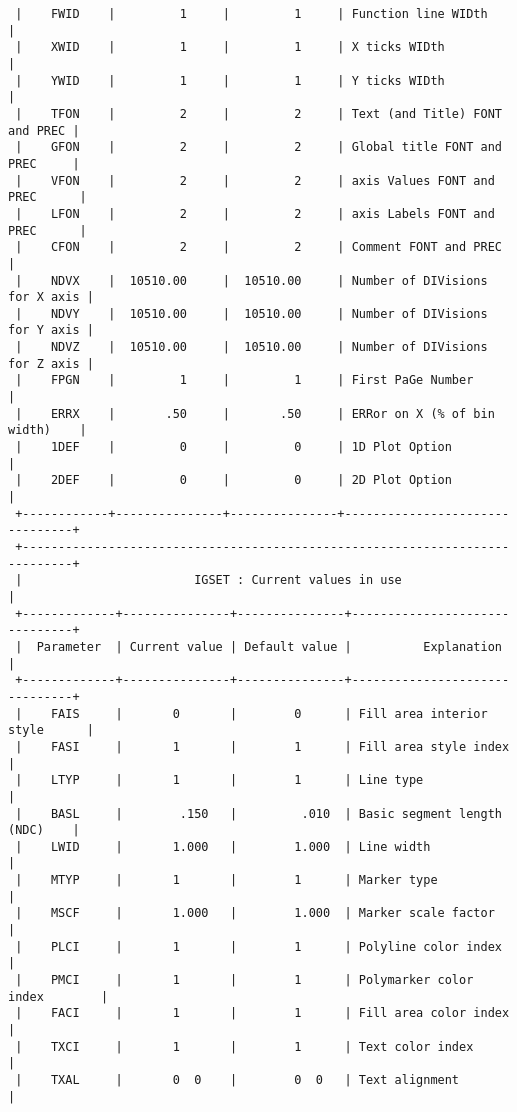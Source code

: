 \begin{verbatim}
 |    FWID    |         1     |         1     | Function line WIDth            |
 |    XWID    |         1     |         1     | X ticks WIDth                  |
 |    YWID    |         1     |         1     | Y ticks WIDth                  |
 |    TFON    |         2     |         2     | Text (and Title) FONT and PREC |
 |    GFON    |         2     |         2     | Global title FONT and PREC     |
 |    VFON    |         2     |         2     | axis Values FONT and PREC      |
 |    LFON    |         2     |         2     | axis Labels FONT and PREC      |
 |    CFON    |         2     |         2     | Comment FONT and PREC          |
 |    NDVX    |  10510.00     |  10510.00     | Number of DIVisions for X axis |
 |    NDVY    |  10510.00     |  10510.00     | Number of DIVisions for Y axis |
 |    NDVZ    |  10510.00     |  10510.00     | Number of DIVisions for Z axis |
 |    FPGN    |         1     |         1     | First PaGe Number              |
 |    ERRX    |       .50     |       .50     | ERRor on X (% of bin width)    |
 |    1DEF    |         0     |         0     | 1D Plot Option                 |
 |    2DEF    |         0     |         0     | 2D Plot Option                 |
 +------------+---------------+---------------+--------------------------------+
 +-----------------------------------------------------------------------------+
 |                        IGSET : Current values in use                        |
 +-------------+---------------+---------------+-------------------------------+
 |  Parameter  | Current value | Default value |          Explanation          |
 +-------------+---------------+---------------+-------------------------------+
 |    FAIS     |       0       |        0      | Fill area interior style      |
 |    FASI     |       1       |        1      | Fill area style index         |
 |    LTYP     |       1       |        1      | Line type                     |
 |    BASL     |        .150   |         .010  | Basic segment length (NDC)    |
 |    LWID     |       1.000   |        1.000  | Line width                    |
 |    MTYP     |       1       |        1      | Marker type                   |
 |    MSCF     |       1.000   |        1.000  | Marker scale factor           |
 |    PLCI     |       1       |        1      | Polyline color index          |
 |    PMCI     |       1       |        1      | Polymarker color index        |
 |    FACI     |       1       |        1      | Fill area color index         |
 |    TXCI     |       1       |        1      | Text color index              |
 |    TXAL     |       0  0    |        0  0   | Text alignment                |

\end{verbatim}
